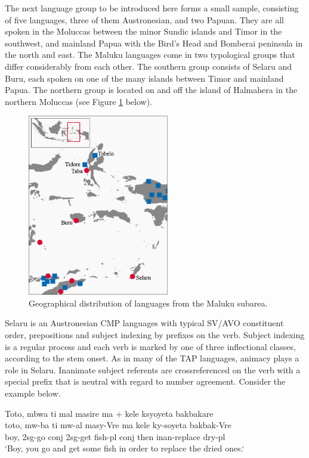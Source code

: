 The next language group to be introduced here forms a small sample, consisting of five languages, three of them Austronesian, and two Papuan. They are all spoken in the Moluccas between the minor Sundic islands and Timor in the southwest, and mainland Papua with the Bird's Head and Bomberai peninsula in the north and east. The Maluku languages come in two typological groups that differ considerably from each other. The southern group consists of Selaru and Buru, each spoken on one of the many islands between Timor and mainland Papua. The northern group is located on and off the island of Halmahera in the northern Moluccas (see Figure \ref{map:Mal} below).

\begin{figure}

\includegraphics[width=0.55\textwidth]{figures/Map_Maluku2.eps}
\caption{Geographical distribution of languages from the Maluku subarea.}\label{map:Mal}

\end{figure}

Selaru is an Austronesian CMP languages with typical SV/AVO constituent order, prepositions and subject indexing by prefixes on the verb. Subject indexing is a regular process and each verb is marked by one of three inflectional classes, according to the stem onset. As in many of the TAP languages, animacy plays a role in Selaru. Inanimate subject referents are crossreferenced on the verb with a special prefix that is neutral with regard to number agreement. Consider the example below.

\ea \label{selaru1}
\gll Toto, mbwa ti mal masire ma + kele ksyoyeta bakbakare \\
toto, mw-ba ti mw-al masy-Vre ma kele ky-soyeta bakbak-Vre \\
\glc boy, \acs{2}\acs{sg}-go \acs{conj} \acs{2}\acs{sg}-get fish-\acs{pl} \acs{conj} then \acs{inan}-replace dry-\acs{pl} \\
\glft `Boy, you go and get some fish in order to replace the dried ones.‘ \\ 
\z
\xe

